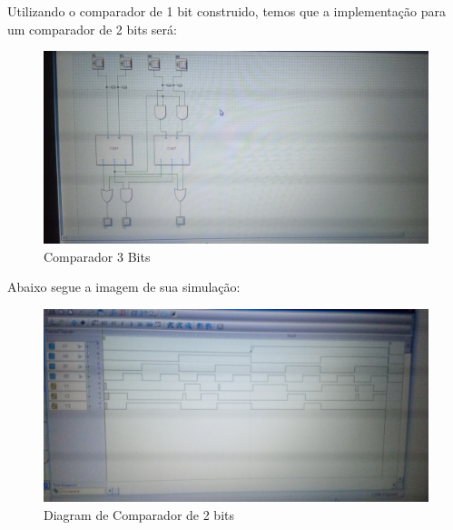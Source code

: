\documentclass[12pt]{article}
\begin{document}
Utilizando o comparador de 1 bit construido, temos que a implementação para um comparador de 2 bits será:

\begin{figure}[H]
    \centering
    \includegraphics[width=.9\textwidth]{Exp04/2.1_D.jpg}
    \caption{Comparador 3 Bits}\label{fig:Comparador1Bit.png}
\end{figure}

Abaixo segue a imagem de sua simulação:

\begin{figure}[H]
    \centering
    \includegraphics[width=.9\textwidth]{Exp04/exp4_2_2__c_wave.png}
    \caption{Diagram de Comparador de 2 bits}\label{fig:exp4_2_2__c_wave.png}
\end{figure}
\end{document}
